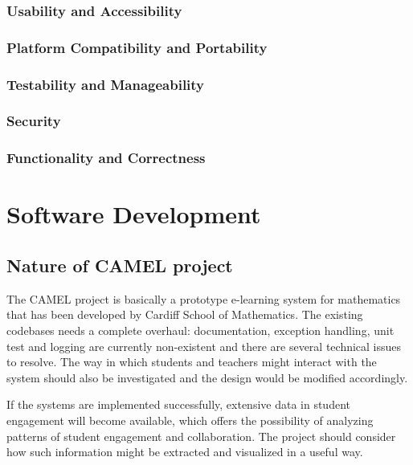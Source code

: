 \subsubsection*{Usability and Accessibility} 

\subsubsection*{Platform Compatibility and Portability} 

\subsubsection*{Testability and Manageability} 

\subsubsection*{Security} 

\subsubsection*{Functionality and Correctness} 



\section{Software Development}

\subsection*{Nature of CAMEL project}
The CAMEL project is basically a prototype e-learning system for mathematics that has been developed by Cardiff School of Mathematics. The existing codebases needs a complete overhaul: documentation, exception handling, unit test and logging are currently non-existent and there are several technical issues to resolve. The way in which students and teachers might interact with the system should also be investigated and the design would be modified accordingly.
 
	If the systems are implemented successfully, extensive data in student engagement will become available, which offers the possibility of analyzing patterns of student engagement and collaboration. The project should consider how such information might be extracted and visualized in a useful way. 

